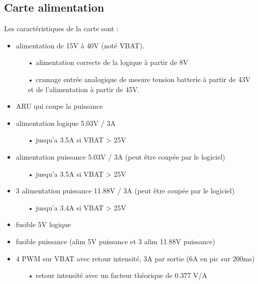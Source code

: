 \subsection{Carte alimentation}
Les caractéristiques de la carte sont :
\begin{itemize}
	\item alimentation de 15V à 40V (noté VBAT).
		\begin{itemize}
			\item[•] alimentation correcte de la logique à partir de 8V
			\item[•] cramage entrée analogique de mesure tension batterie à partir de 43V et de l'alimentation à partir de 45V.
		\end{itemize}
	\item ARU qui coupe la puissance
	\item alimentation logique 5.03V / 3A
		\begin{itemize}
			\item[•] jusqu'a 3.5A si VBAT > 25V
		\end{itemize}
	\item alimentation puissance 5.03V / 3A (peut être coupée par le logiciel)
		\begin{itemize}
			\item[•] jusqu'a 3.5A si VBAT > 25V
		\end{itemize}
	\item 3 alimentation puissance 11.88V / 3A (peut être coupée par le logiciel)
		\begin{itemize}
			\item[•] jusqu'a 3.4A si VBAT > 25V
		\end{itemize}
	\item fusible 5V logique
	\item fusible puissance (alim 5V puissance et 3 alim 11.88V puissance)
	\item 4 PWM sur VBAT avec retour intensité, 3A par sortie (6A en pic sur 200ms)
		\begin{itemize}
			\item[•] retour intensité avec un facteur théorique de 0.377 V/A
		\end{itemize}
\end{itemize}

